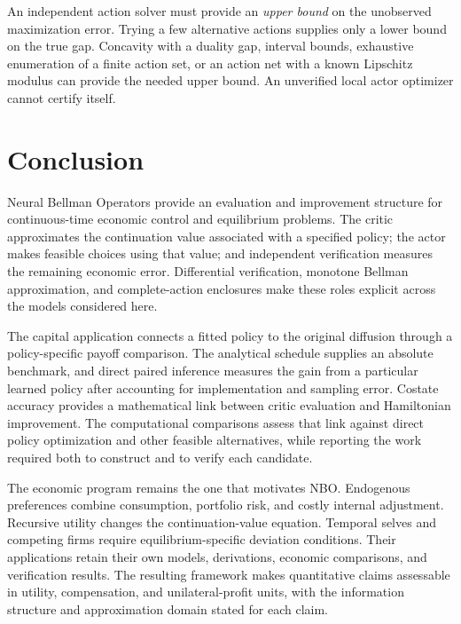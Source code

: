 \documentclass[ecta,nameyear,draft]{econsocart}
\theoremstyle{definition}
\theoremstyle{remark}
\begin{document}
An independent action solver must provide an \emph{upper bound} on the unobserved maximization error. Trying a few alternative actions supplies only a lower bound on the true gap. Concavity with a duality gap, interval bounds, exhaustive enumeration of a finite action set, or an action net with a known Lipschitz modulus can provide the needed upper bound. An unverified local actor optimizer cannot certify itself.














\section{Conclusion}\label{sec:conclusion}
Neural Bellman Operators provide an evaluation and improvement structure for continuous-time economic control and equilibrium problems. The critic approximates the continuation value associated with a specified policy; the actor makes feasible choices using that value; and independent verification measures the remaining economic error. Differential verification, monotone Bellman approximation, and complete-action enclosures make these roles explicit across the models considered here.

The capital application connects a fitted policy to the original diffusion through a policy-specific payoff comparison. The analytical schedule supplies an absolute benchmark, and direct paired inference measures the gain from a particular learned policy after accounting for implementation and sampling error. Costate accuracy provides a mathematical link between critic evaluation and Hamiltonian improvement. The computational comparisons assess that link against direct policy optimization and other feasible alternatives, while reporting the work required both to construct and to verify each candidate.

The economic program remains the one that motivates NBO. Endogenous preferences combine consumption, portfolio risk, and costly internal adjustment. Recursive utility changes the continuation-value equation. Temporal selves and competing firms require equilibrium-specific deviation conditions. Their applications retain their own models, derivations, economic comparisons, and verification results. The resulting framework makes quantitative claims assessable in utility, compensation, and unilateral-profit units, with the information structure and approximation domain stated for each claim.
\end{document}
